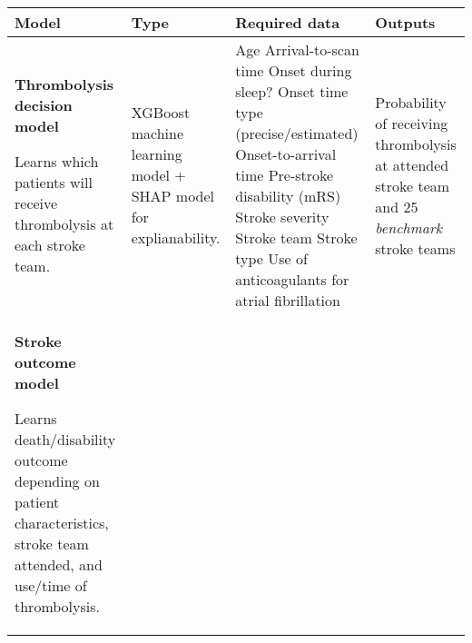 \begin{landscape}
{
\RaggedRight
\begin{table}
\small
\raggedright
\begin{tabular}{|p{5cm}|p{5cm}|p{6cm}|p{6cm}|}

\hline
\textbf{Model} &  \textbf{Type} & \textbf{Required data} & \textbf{Outputs} \\
\hline

\textbf{Thrombolysis decision model} 

\vspace{2mm}

Learns which patients will receive thrombolysis at each stroke team. & 

XGBoost machine learning model + SHAP model for explianability. & 

Age\newline\vspace{3pt}
Arrival-to-scan time\newline\vspace{3pt}
Onset during sleep?\newline\vspace{3pt}
Onset time type (precise/estimated)\newline\vspace{3pt}
Onset-to-arrival time\newline\vspace{3pt}
Pre-stroke disability (mRS)\newline\vspace{3pt}
Stroke severity\newline\vspace{3pt}
Stroke team\newline\vspace{3pt}
Stroke type\newline\vspace{3pt}
Use of anticoagulants for atrial fibrillation & 

Probability of receiving thrombolysis at attended stroke team and 25 \textit{benchmark} stroke teams \\

\hline


\textbf{Stroke outcome model}

\vspace{3mm}

Learns death/disability outcome depending on patient characteristics, stroke team attended, and use/time of thrombolysis. &


\end{tabular}
\end{table}}
\end{landscape}
